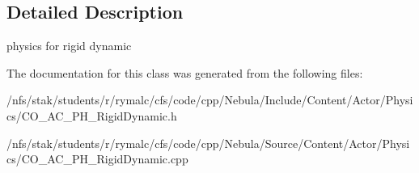 \subsection{Detailed Description}
physics for rigid dynamic 

The documentation for this class was generated from the following files:\begin{DoxyCompactItemize}
\item 
/nfs/stak/students/r/rymalc/cfs/code/cpp/Nebula/Include/Content/Actor/Physics/CO\_\-AC\_\-PH\_\-RigidDynamic.h\item 
/nfs/stak/students/r/rymalc/cfs/code/cpp/Nebula/Source/Content/Actor/Physics/CO\_\-AC\_\-PH\_\-RigidDynamic.cpp\end{DoxyCompactItemize}

